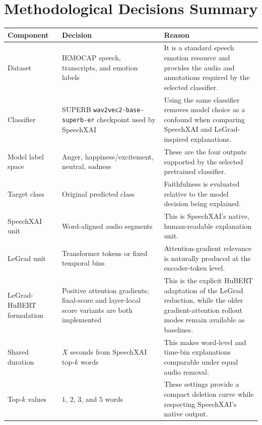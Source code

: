 \documentclass[11pt]{article}
\begin{document}
\section{Methodological Decisions Summary}

\begin{longtable}{p{} p{} p{}}
\toprule
\textbf{Component} & \textbf{Decision} & \textbf{Reason} \\
\midrule
Dataset & IEMOCAP speech, transcripts, and emotion labels & It is a standard speech emotion resource and provides the audio and annotations required by the selected classifier. \\

Classifier & SUPERB \texttt{wav2vec2-base-superb-er} checkpoint used by SpeechXAI & Using the same classifier removes model choice as a confound when comparing SpeechXAI and LeGrad-inspired explanations. \\

Model label space & Anger, happiness/excitement, neutral, sadness & These are the four outputs supported by the selected pretrained classifier. \\

Target class & Original predicted class & Faithfulness is evaluated relative to the model decision being explained. \\

SpeechXAI unit & Word-aligned audio segments & This is SpeechXAI's native, human-readable explanation unit. \\

LeGrad unit & Transformer tokens or fixed temporal bins & Attention-gradient relevance is naturally produced at the encoder-token level. \\

LeGrad-HuBERT formulation & Positive attention gradients; final-score and layer-local score variants are both implemented & This is the explicit HuBERT adaptation of the LeGrad reduction, while the older gradient-attention rollout modes remain available as baselines. \\

Shared duration & $X$ seconds from SpeechXAI top-$k$ words & This makes word-level and time-bin explanations comparable under equal audio removal. \\

Top-$k$ values & $1$, $2$, $3$, and $5$ words & These settings provide a compact deletion curve while respecting SpeechXAI's native output. \\


\end{longtable}
\end{document}
